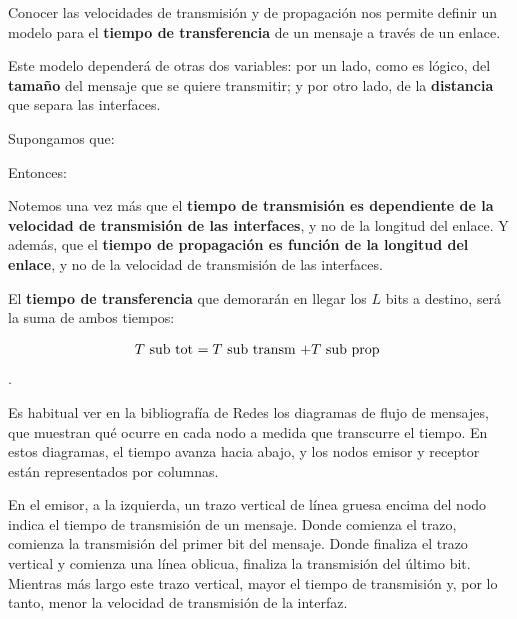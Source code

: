 \documentclass[spanish,A4,]{article}
\begin{document}
Conocer las velocidades de transmisión y de propagación nos permite
definir un modelo para el \textbf{tiempo de transferencia} de un mensaje
a través de un enlace.

Este modelo dependerá de otras dos variables: por un lado, como es
lógico, del \textbf{tamaño} del mensaje que se quiere transmitir; y por
otro lado, de la \textbf{distancia} que separa las interfaces.

Supongamos que:


Entonces:


Notemos una vez más que el \textbf{tiempo de transmisión es dependiente
de la velocidad de transmisión de las interfaces}, y no de la longitud
del enlace. Y además, que el \textbf{tiempo de propagación es función de
la longitud del enlace}, y no de la velocidad de transmisión de las
interfaces.

El \textbf{tiempo de transferencia} que demorarán en llegar los $L$ bits
a destino, será la suma de ambos tiempos:

\[T$ sub tot $ = T$ sub transm $ + T$ sub prop $\].

Es habitual ver en la bibliografía de Redes los diagramas de flujo de
mensajes, que muestran qué ocurre en cada nodo a medida que transcurre
el tiempo. En estos diagramas, el tiempo avanza hacia abajo, y los nodos
emisor y receptor están representados por columnas.

En el emisor, a la izquierda, un trazo vertical de línea gruesa encima
del nodo indica el tiempo de transmisión de un mensaje. Donde comienza
el trazo, comienza la transmisión del primer bit del mensaje. Donde
finaliza el trazo vertical y comienza una línea oblicua, finaliza la
transmisión del último bit. Mientras más largo este trazo vertical,
mayor el tiempo de transmisión y, por lo tanto, menor la velocidad de
transmisión de la interfaz.
\end{document}
